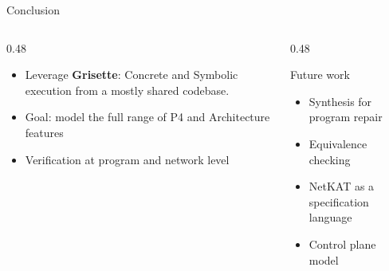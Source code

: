 \documentclass[aspectratio=169]{beamer}
\begin{document}
\begin{frame}{Conclusion}
  \begin{columns}[T]
    
    \begin{column}{0.48\textwidth}
        \begin{itemize}
          \item Leverage \textbf{Grisette}: Concrete and Symbolic execution from a mostly shared codebase.
          \item Goal: model the full range of P4 and Architecture features
          \item Verification at program and network level
        \end{itemize}
    \end{column}
    
    \begin{column}{0.48\textwidth}
      \begin{block}{Future work}
        \begin{itemize}\setlength\itemsep{6pt}
          \item Synthesis for program repair
          \item Equivalence checking
          \item NetKAT as a specification language
          \item Control plane model
        \end{itemize}
      \end{block}
    \end{column}
    
  \end{columns}
\end{frame}
\end{document}
